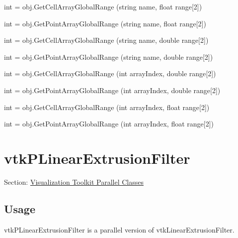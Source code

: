 \begin{DoxyItemize}
\item {\ttfamily int = obj.\-Get\-Cell\-Array\-Global\-Range (string name, float range\mbox{[}2\mbox{]})}  
\item {\ttfamily int = obj.\-Get\-Point\-Array\-Global\-Range (string name, float range\mbox{[}2\mbox{]})}  
\item {\ttfamily int = obj.\-Get\-Cell\-Array\-Global\-Range (string name, double range\mbox{[}2\mbox{]})}  
\item {\ttfamily int = obj.\-Get\-Point\-Array\-Global\-Range (string name, double range\mbox{[}2\mbox{]})}  
\item {\ttfamily int = obj.\-Get\-Cell\-Array\-Global\-Range (int array\-Index, double range\mbox{[}2\mbox{]})}  
\item {\ttfamily int = obj.\-Get\-Point\-Array\-Global\-Range (int array\-Index, double range\mbox{[}2\mbox{]})}  
\item {\ttfamily int = obj.\-Get\-Cell\-Array\-Global\-Range (int array\-Index, float range\mbox{[}2\mbox{]})}  
\item {\ttfamily int = obj.\-Get\-Point\-Array\-Global\-Range (int array\-Index, float range\mbox{[}2\mbox{]})}  
\end{DoxyItemize}\hypertarget{vtkparallel_vtkplinearextrusionfilter}{}\section{vtk\-P\-Linear\-Extrusion\-Filter}\label{vtkparallel_vtkplinearextrusionfilter}
Section\-: \hyperlink{sec_vtkparallel}{Visualization Toolkit Parallel Classes} \hypertarget{vtkwidgets_vtkxyplotwidget_Usage}{}\subsection{Usage}\label{vtkwidgets_vtkxyplotwidget_Usage}
vtk\-P\-Linear\-Extrusion\-Filter is a parallel version of vtk\-Linear\-Extrusion\-Filter.

